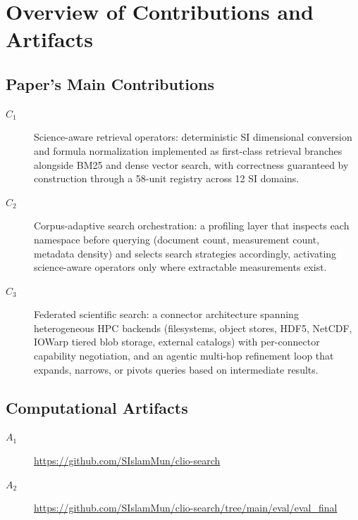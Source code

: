 \documentclass[conference]{IEEEtran}
\begin{document}


\appendixAD

\section{Overview of Contributions and Artifacts}

\subsection{Paper's Main Contributions}

\begin{description}
\item[$C_1$] Science-aware retrieval operators: deterministic SI dimensional conversion and formula normalization implemented as first-class retrieval branches alongside BM25 and dense vector search, with correctness guaranteed by construction through a 58-unit registry across 12 SI domains.
\item[$C_2$] Corpus-adaptive search orchestration: a profiling layer that inspects each namespace before querying (document count, measurement count, metadata density) and selects search strategies accordingly, activating science-aware operators only where extractable measurements exist.
\item[$C_3$] Federated scientific search: a connector architecture spanning heterogeneous HPC backends (filesystems, object stores, HDF5, NetCDF, IOWarp tiered blob storage, external catalogs) with per-connector capability negotiation, and an agentic multi-hop refinement loop that expands, narrows, or pivots queries based on intermediate results.
\end{description}


\subsection{Computational Artifacts}

\begin{description}
\item[$A_1$] \url{https://github.com/SIslamMun/clio-search}
\item[$A_2$] \url{https://github.com/SIslamMun/clio-search/tree/main/eval/eval_final}
\end{description}
\end{document}
